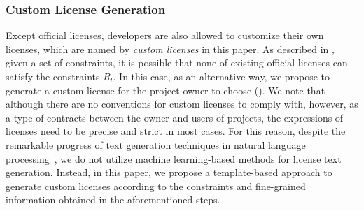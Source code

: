 \subsubsection{{Custom License Generation}}\label{sec:custom}

Except official licenses, developers are also allowed to customize their own licenses, which are named by \textit{custom licenses} in this paper. As described in , given a set of constraints, it is possible that none of existing official licenses can satisfy the constraints $R_l$. In this case, as an alternative way, we propose to generate a custom license for the project owner to choose (). We note that although there are no conventions for custom licenses to comply with, however, as a type of contracts between the owner and users of projects, the expressions of licenses need to be precise and strict in most cases. For this reason, despite the remarkable progress of text generation techniques in natural language processing~\cite{yu2022survey}, we do not utilize machine learning-based methods for license text generation. Instead, in this paper, we propose a template-based approach to generate custom licenses according to the constraints and fine-grained information obtained in the aforementioned steps. 

